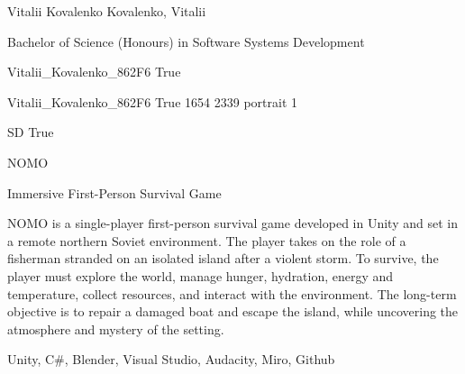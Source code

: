 \documentclass[twoside]{report}
\begin{document}
\begingroup{}\relax



\def\Key{Vitalii_Kovalenko_862F6}

{Vitalii Kovalenko}
{Kovalenko, Vitalii}

{Bachelor of Science (Honours) in Software Systems Development}

{Vitalii_Kovalenko_862F6}
{True}

{Vitalii_Kovalenko_862F6}
{True}
{1654}
{2339}
{portrait}
{1}

{SD}
{True}

{NOMO}

{Immersive First-Person Survival Game}

{NOMO is a single-player first-person survival game developed in Unity and set in a remote northern Soviet environment. The player takes on the role of a fisherman stranded on an isolated island after a violent storm. To survive, the player must explore the world, manage hunger, hydration, energy and temperature, collect resources, and interact with the environment. The long-term objective is to repair a damaged boat and escape the island, while uncovering the atmosphere and mystery of the setting.}

{Unity, C\#, Blender, Visual Studio, Audacity, Miro, Github}
\end{document}
